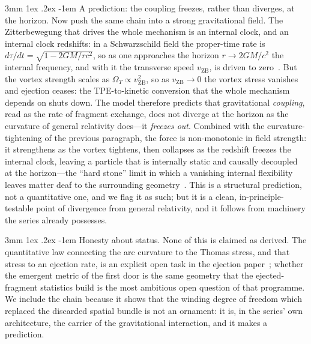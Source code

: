 \documentclass[%
 reprint, amsmath,amssymb, aps, prb, ]{revtex4-2}
\makeatletter
\numberwithin{equation}{section}
\renewcommand\paragraph{%
  \@startsection{paragraph}{4}{\z@}%
    {3mm \@plus 1ex \@minus .2ex}%
    {-1em}%
    {\normalfont\normalsize\itshape}}
\makeatother
\begin{document}
\paragraph{A prediction: the coupling freezes, rather than diverges, at the horizon.}
Now push the same chain into a strong gravitational field. The Zitterbewegung that drives the whole mechanism is an internal clock, and an internal clock redshifts: in a Schwarzschild field the proper-time rate is $d\tau/dt=\sqrt{1-2GM/rc^2}$, so as one approaches the horizon $r\to 2GM/c^2$ the internal frequency, and with it the transverse speed $v_{\text{ZB}}$, is driven to zero~\cite{hanamura22}. But the vortex strength scales as $\Omega_T\propto v_{\text{ZB}}^2$, so as $v_{\text{ZB}}\to 0$ the vortex stress vanishes and ejection ceases: the TPE-to-kinetic conversion that the whole mechanism depends on shuts down. The model therefore predicts that gravitational \emph{coupling}, read as the rate of fragment exchange, does not diverge at the horizon as the curvature of general relativity does---it \emph{freezes out}. Combined with the curvature-tightening of the previous paragraph, the force is non-monotonic in field strength: it strengthens as the vortex tightens, then collapses as the redshift freezes the internal clock, leaving a particle that is internally static and causally decoupled at the horizon---the ``hard stone'' limit in which a vanishing internal flexibility leaves matter deaf to the surrounding geometry~\cite{hanamura53}. This is a structural prediction, not a quantitative one, and we flag it as such; but it is a clean, in-principle-testable point of divergence from general relativity, and it follows from machinery the series already possesses.

\paragraph{Honesty about status.}
None of this is claimed as derived. The quantitative law connecting the arc curvature to the Thomas stress, and that stress to an ejection rate, is an explicit open task in the ejection paper~\cite{hanamura49}; whether the emergent metric of the first door is the same geometry that the ejected-fragment statistics build is the most ambitious open question of that programme. We include the chain because it shows that the winding degree of freedom which replaced the discarded spatial bundle is not an ornament: it is, in the series' own architecture, the carrier of the gravitational interaction, and it makes a prediction.
\end{document}
